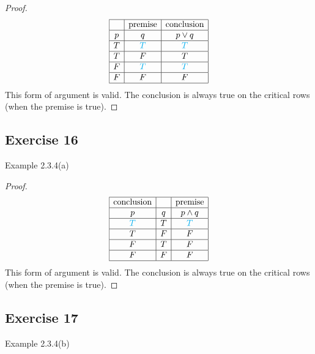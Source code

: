 \documentclass[14pt]{extarticle}
\begin{document}
\begin{proof}
    $$
        \begin{array}{|c|c|c|}
            \hline
              & \text{premise} & \text{conclusion} \\
            \hline
            p & q              & p \vee q          \\
            \hline
            T & \color{cyan} T & \color{cyan} T    \\
            \hline
            T & F              & T                 \\
            \hline
            F & \color{cyan} T & \color{cyan} T    \\
            \hline
            F & F              & F                 \\
            \hline
        \end{array}
    $$
    This form of argument is valid. The conclusion is always true on the critical rows (when the premise is true).
\end{proof}

\subsection{Exercise 16}
Example 2.3.4(a)

\begin{proof}
    $$
        \begin{array}{|c|c|c|}
            \hline
            \text{conclusion} &   & \text{premise} \\
            \hline
            p                 & q & p \wedge q     \\
            \hline
            \color{cyan} T    & T & \color{cyan} T \\
            \hline
            T                 & F & F              \\
            \hline
            F                 & T & F              \\
            \hline
            F                 & F & F              \\
            \hline
        \end{array}
    $$
    This form of argument is valid. The conclusion is always true on the critical rows (when the premise is true).
\end{proof}

\subsection{Exercise 17}
Example 2.3.4(b)
\end{document}
